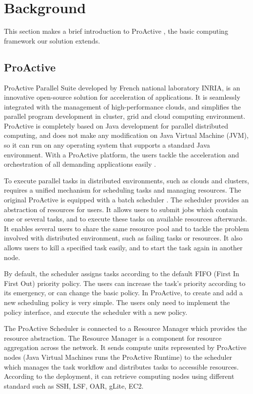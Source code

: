 \section{Background} \label{sec-background}

This section makes a brief introduction to ProActive \cite{huet04high}, the basic
computing framework our solution extends.

\subsection{ProActive}

ProActive Parallel Suite developed by French national laboratory INRIA, is an innovative
open-source solution for acceleration of applications. It is seamlessly integrated with
the management of high-performance clouds, and simplifies the parallel program development
in cluster, grid and cloud computing environment. ProActive is completely based on Java
development for parallel distributed computing, and does not make any modification on Java
Virtual Machine (JVM), so it can run on any operating system that supports a standard
Java environment. With a ProActive platform, the users tackle the acceleration and
orchestration of all demanding applications easily \cite{ProActive}.

To execute parallel tasks in distributed environments, such as clouds and clusters,
requires a unified mechanism for scheduling tasks and managing resources. The original
ProActive is equipped with a batch scheduler \cite{ProActiveScheduling}. The scheduler
provides an abstraction of resources for users. It allows users to submit jobs which contain
one or several tasks, and to execute these tasks on available resources afterwards. It enables
several users to share the same resource pool and to tackle the problem involved with
distributed environment, such as failing tasks or resources. It also allows users to kill a
specified task easily, and to start the task again in another node.

By default, the scheduler assigns tasks according to the default FIFO (First In First Out)
priority policy. The users can increase the task's priority according to its emergency,
or can change the basic policy. In ProActive, to create and add a new scheduling
policy is very simple. The users only need to implement the policy interface, and execute
the scheduler with a new policy.

The ProActive Scheduler \cite{pascheduling} is connected to a Resource Manager \cite{parm}
which provides the resource abstraction. The Resource Manager is a component for resource
aggregation across the network. It sends compute units represented by ProActive nodes
(Java Virtual Machines runs the ProActive Runtime) to the scheduler which manages the
task workflow and distributes tasks to accessible resources. According to the deployment,
it can retrieve computing nodes using different standard such as SSH, LSF, OAR, gLite,
EC2.

